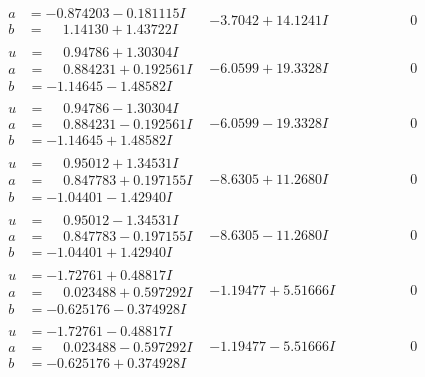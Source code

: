 \documentclass[1p]{elsarticle_modified}
\theoremstyle{definition}
\begin{document}
$$\begin{array}{c|c|c}
\begin{aligned}
a &= -0.874203 - 0.181115 I \\
b &= \phantom{-}1.14130 + 1.43722 I\end{aligned}
 & -3.7042 + 14.1241 I & \phantom{-0.000000 } 0 \\ \hline\begin{aligned}
u &= \phantom{-}0.94786 + 1.30304 I \\
a &= \phantom{-}0.884231 + 0.192561 I \\
b &= -1.14645 - 1.48582 I\end{aligned}
 & -6.0599 + 19.3328 I & \phantom{-0.000000 } 0 \\ \hline\begin{aligned}
u &= \phantom{-}0.94786 - 1.30304 I \\
a &= \phantom{-}0.884231 - 0.192561 I \\
b &= -1.14645 + 1.48582 I\end{aligned}
 & -6.0599 - 19.3328 I & \phantom{-0.000000 } 0 \\ \hline\begin{aligned}
u &= \phantom{-}0.95012 + 1.34531 I \\
a &= \phantom{-}0.847783 + 0.197155 I \\
b &= -1.04401 - 1.42940 I\end{aligned}
 & -8.6305 + 11.2680 I & \phantom{-0.000000 } 0 \\ \hline\begin{aligned}
u &= \phantom{-}0.95012 - 1.34531 I \\
a &= \phantom{-}0.847783 - 0.197155 I \\
b &= -1.04401 + 1.42940 I\end{aligned}
 & -8.6305 - 11.2680 I & \phantom{-0.000000 } 0 \\ \hline\begin{aligned}
u &= -1.72761 + 0.48817 I \\
a &= \phantom{-}0.023488 + 0.597292 I \\
b &= -0.625176 - 0.374928 I\end{aligned}
 & -1.19477 + 5.51666 I & \phantom{-0.000000 } 0 \\ \hline\begin{aligned}
u &= -1.72761 - 0.48817 I \\
a &= \phantom{-}0.023488 - 0.597292 I \\
b &= -0.625176 + 0.374928 I\end{aligned}
 & -1.19477 - 5.51666 I & \phantom{-0.000000 } 0 \\ \hline\begin{aligned}

\end{aligned}
\end{array}$$
\end{document}
